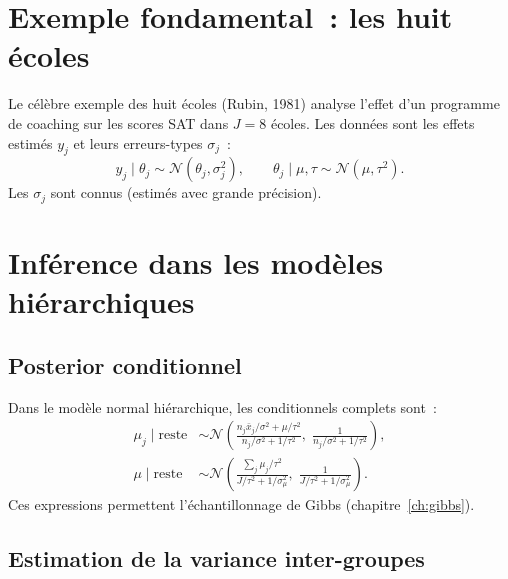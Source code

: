 \section{Exemple fondamental~: les huit \'ecoles}

\begin{exemple}
Le c\'el\`ebre exemple des \og huit \'ecoles \fg (Rubin, 1981)
analyse l'effet d'un programme de coaching sur les scores SAT dans
$J = 8$ \'ecoles. Les donn\'ees sont les effets estim\'es $y_j$ et
leurs erreurs-types $\sigma_j$~:
\[
  y_j \mid \theta_j \sim \mathcal{N}(\theta_j, \sigma_j^2), \qquad
  \theta_j \mid \mu, \tau \sim \mathcal{N}(\mu, \tau^2).
\]
Les $\sigma_j$ sont connus (estim\'es avec grande pr\'ecision).
\end{exemple}

\section{Inf\'erence dans les mod\`eles hi\'erarchiques}

\subsection{Posterior conditionnel}

\begin{proposition}
Dans le mod\`ele normal hi\'erarchique, les conditionnels complets sont~:
\begin{align*}
  \mu_j \mid \text{reste} &\sim \mathcal{N}\!\left(
  \frac{n_j\bar{x}_j/\sigma^2 + \mu/\tau^2}{n_j/\sigma^2 + 1/\tau^2},\;
  \frac{1}{n_j/\sigma^2 + 1/\tau^2}\right), \\
  \mu \mid \text{reste} &\sim \mathcal{N}\!\left(
  \frac{\sum_j \mu_j / \tau^2}{J/\tau^2 + 1/\sigma_\mu^2},\;
  \frac{1}{J/\tau^2 + 1/\sigma_\mu^2}\right).
\end{align*}
Ces expressions permettent l'\'echantillonnage de Gibbs
(chapitre~\ref{ch:gibbs}).
\end{proposition}

\subsection{Estimation de la variance inter-groupes}

